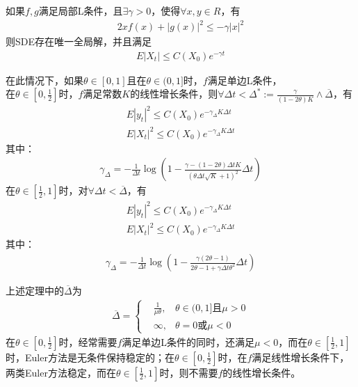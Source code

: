         \begin{theorem}[Euler稳定性]
        如果$f,g$满足局部L条件，且$\exists \gamma >0$，使得$\forall x,y\in R$，有
        \begin{align*}
            2xf(x)+|g(x)|^2 \leqslant -\gamma |x|^2
        \end{align*}
        则SDE存在唯一全局解，并且满足
        \begin{align*}
        E|X_t| \leqslant C(X_0)e^{-\gamma t}
        \end{align*}
        \par
        在此情况下，如果$\theta \in [0,1]$且在$\theta\in (0,1]$时，$f$满足单边L条件，\\
        在$\theta \in [0,\frac 12]$时，$f$满足常数$K$的线性增长条件，则$\forall \Delta t< \Delta ^* :=\frac{\gamma}{(1-2\theta)K} \wedge\overline{\Delta} $，有
        \begin{align*}
        E|y_t|^2 \leqslant C(X_0)e^{-\gamma_{\Delta}K\Delta t}\\
        E|X_t|^2 \leqslant C(X_0)e^{-\gamma_{\Delta}K\Delta t}
        \end{align*}
        其中：
        \begin{align*}
        \gamma_{\Delta} = -\frac{1}{\Delta t}\log \left( 1-\frac{\gamma-(1-2\theta)\Delta tK}{(\theta\Delta t\sqrt{K}+1)^2} \Delta t\right)
        \end{align*}
        在$\theta \in [\frac 12,1]$时，对$\forall \Delta t < \overline{\Delta}$，有
        \begin{align*}
        E|y_t|^2 \leqslant C(X_0)e^{-\gamma_{\Delta}K\Delta t}\\
        E|X_t|^2 \leqslant C(X_0)e^{-\gamma_{\Delta}K\Delta t}
        \end{align*}
        其中：
        \begin{align*}
        \gamma_\Delta = -\frac{1}{\Delta t}\log \left( 1- \frac{\gamma(2\theta-1)}{2\theta -1+\gamma \Delta t\theta^2} \Delta t\right)
        \end{align*}
        \end{theorem}
        \par
        上述定理中的$\overline{\Delta }$为
        \begin{align*}
            \overline{\Delta } =
            \left\{
            \begin{aligned}
            &\frac{1}{\mu \theta},&\theta \in (0,1]\text{且}\mu>0\\
            &\infty ,&\theta = 0\text{或}\mu<0
            \end{aligned}
            \right.
        \end{align*}
        在$\theta \in [0,\frac 12]$时，经常需要$f$满足单边L条件的同时，还满足$\mu<0$，而在$\theta \in [\frac 12 ,1]$时，Euler方法是无条件保持稳定的；在$\theta \in [0,\frac 12]$时，在$f$满足线性增长条件下，两类Euler方法稳定，而在$\theta \in[\frac 12,1]$时，则不需要$f$的线性增长条件。
